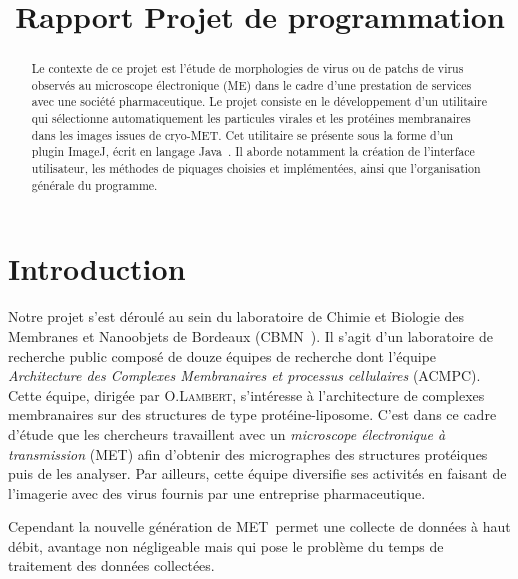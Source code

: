 \documentclass[12pt,a4paper]{report}
\title{Rapport Projet de programmation}
\begin{document}

\newcommand{\cme}{cryo-MET}
\newcommand{\me}{MET}
\newcommand{\java}{Java~{\tiny \texttrademark}}
\newcommand{\js}{JavaScript}
\newcommand{\imj}{ImageJ}

\begin{abstract}
Le contexte de ce projet est l'étude de morphologies de virus ou de patchs de virus observés au microscope électronique (ME) dans le cadre d'une prestation de services avec une société pharmaceutique. Le projet consiste en le développement d'un utilitaire qui sélectionne automatiquement les particules virales et les protéines membranaires dans les images issues de \cme. Cet utilitaire se présente sous la forme d'un plugin ImageJ, écrit en  langage \java.
Il aborde notamment la création de l'interface utilisateur, les méthodes de piquages choisies et implémentées, ainsi que l'organisation générale du programme. 
\end{abstract}

\tableofcontents
\chapter*{Introduction}

Notre projet s'est déroulé au sein du laboratoire de Chimie et Biologie des Membranes et Nanoobjets de Bordeaux (CBMN~\cite{cbmn:url}).
Il s'agit d'un laboratoire de recherche public composé de douze équipes de recherche dont l'équipe \emph{Architecture des Complexes Membranaires et processus cellulaires} (ACMPC). %
Cette équipe, dirigée par O.\textsc{Lambert}, s'intéresse à l'architecture de complexes membranaires sur des structures de type protéine-liposome. C'est dans ce cadre d'étude que les chercheurs travaillent avec un \emph{microscope électronique à transmission} (\me) afin d'obtenir des micrographes des structures protéiques puis de les analyser. Par ailleurs, cette équipe diversifie ses activités en faisant de l'imagerie avec des virus fournis par une entreprise pharmaceutique.

\noindent
Cependant la nouvelle génération de \me ~permet une collecte de données à haut débit, avantage non négligeable mais qui pose le problème du temps de traitement des données collectées. %
\end{document}
